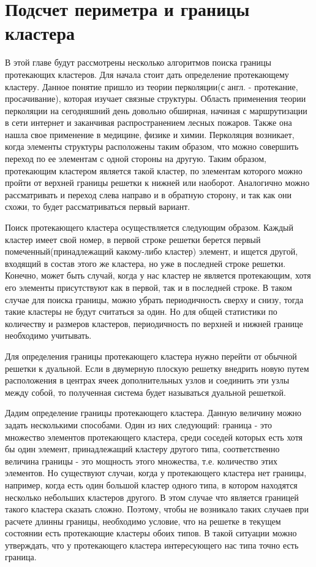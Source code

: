 \documentclass[14pt]{article}
\begin{document}
\section{Подсчет периметра и границы кластера}
\par В этой главе будут рассмотрены несколько алгоритмов поиска границы протекающих кластеров. Для начала стоит дать определение протекающему кластеру. Данное понятие пришло из теории перколяции(с англ. - протекание, просачивание), которая изучает связные структуры. Область применения теории перколяции на сегодняшний день довольно обширная, начиная с маршрутизации в сети интернет и заканчивая распространением лесных пожаров. Также она нашла свое применение в медицине, физике и химии. Перколяция возникает, когда элементы структуры расположены таким образом, что можно совершить переход по ее элементам с одной стороны на другую. Таким образом, протекающим кластером является такой кластер, по элементам которого можно пройти от верхней границы решетки к нижней или наоборот. Аналогично можно рассматривать и переход слева направо и в обратную сторону, и так как они схожи, то будет рассматриваться первый вариант.
\par Поиск протекающего кластера осуществляется следующим образом. Каждый кластер имеет свой номер, в первой строке решетки берется первый помеченный(принадлежащий какому-либо кластер) элемент, и ищется другой, входящий в состав этого же кластера, но уже в последней строке решетки. Конечно, может быть случай, когда у нас кластер не является протекающим, хотя его элементы присутствуют как в первой, так и в последней строке. В таком случае для поиска границы, можно убрать периодичность сверху и снизу, тогда такие кластеры не будут считаться за один. Но для общей статистики по количеству и размеров кластеров, периодичность по верхней и нижней границе необходимо учитывать.
\par Для определения границы протекающего кластера нужно перейти от обычной решетки к дуальной. Если в двумерную плоскую решетку внедрить новую путем расположения в  центрах ячеек дополнительных узлов и соединить эти узлы между собой, то полученная система будет называться дуальной решеткой. 
\par Дадим определение границы протекающего кластера. Данную величину можно задать несколькими способами. Один из них следующий: граница - это множество элементов протекающего кластера, среди соседей которых есть хотя бы один элемент, принадлежащий кластеру другого типа, соответственно величина границы - это мощность этого множества, т.е. количество этих элементов.  Но существуют случаи, когда у протекающего кластера нет границы, например, когда есть один большой кластер одного типа, в котором находятся несколько небольших кластеров другого. В этом случае что является границей такого кластера сказать сложно. Поэтому, чтобы не возникало таких случаев при расчете длинны границы, необходимо условие, что на решетке в текущем состоянии есть протекающие кластеры обоих типов. В такой ситуации можно утверждать, что у протекающего кластера интересующего нас типа точно есть граница.
\end{document}

